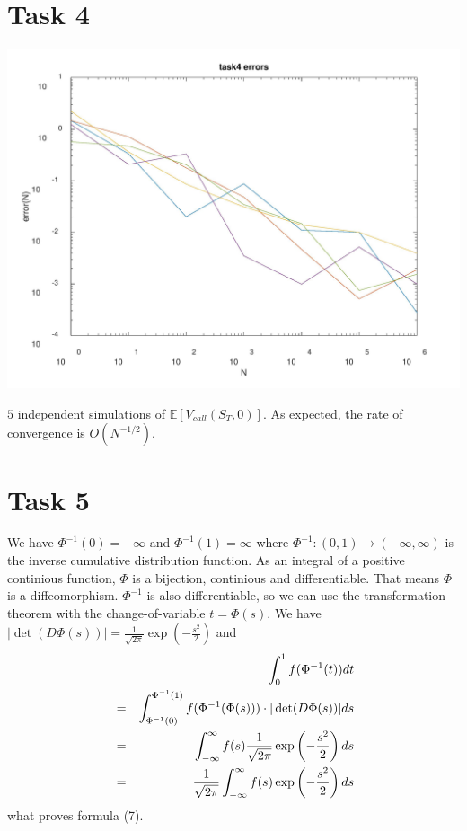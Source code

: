 \documentclass[10pt,a4paper]{article}
\begin{document}
\section*{Task 4}

\begin{center}
\includegraphics[scale=0.3]{task4.jpg}		
\end{center}	

$5$ independent simulations of $\mathbb{E}[V_{call}(S_T,0)]$. As expected, the rate of convergence is $O(N^{-1/2})$.

\section*{Task 5}
We have $\Phi^{-1}(0)=-\infty$ and $\Phi^{-1}(1)=\infty$ where $\Phi^{-1}:(0,1)\to(-\infty,\infty)$ is the inverse cumulative distribution function. As an integral of a positive continious function, $\Phi$ is a bijection, continious and differentiable. That means $\Phi$ is a diffeomorphism. $\Phi^{-1}$ is also differentiable, so we can use the transformation theorem with the change-of-variable $t=\Phi(s)$. We have $|\det(D\Phi(s))|=\frac{1}{\sqrt{2\pi}}\exp(-\frac{s^2}{2})$ and
\begin{eqnarray}
&&\int_0^1 f(\Phi^{-1}(t))dt \notag\\
&=&\int_{\Phi^{-1}(0)}^{\Phi^{-1}(1)}f(\Phi^{-1}(\Phi(s)))\cdot|\det(D\Phi(s))|ds \notag\\
&=&\int_{-\infty}^{\infty}f(s)\frac{1}{\sqrt{2\pi}}\exp\left(-\frac{s^2}{2}\right)ds \notag\\
&=&\frac{1}{\sqrt{2\pi}}\int_{-\infty}^{\infty}f(s)\exp\left(-\frac{s^2}{2}\right)ds \notag
\end{eqnarray}
what proves formula (7).
\end{document}

